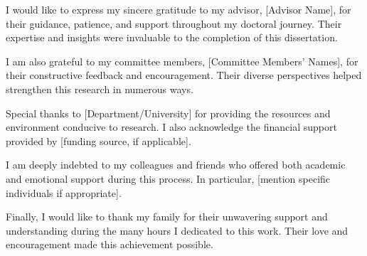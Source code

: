 I would like to express my sincere gratitude to my advisor, [Advisor Name], for their guidance, patience, and support throughout my doctoral journey. Their expertise and insights were invaluable to the completion of this dissertation.

I am also grateful to my committee members, [Committee Members' Names], for their constructive feedback and encouragement. Their diverse perspectives helped strengthen this research in numerous ways.

Special thanks to [Department/University] for providing the resources and environment conducive to research. I also acknowledge the financial support provided by [funding source, if applicable].

I am deeply indebted to my colleagues and friends who offered both academic and emotional support during this process. In particular, [mention specific individuals if appropriate].

Finally, I would like to thank my family for their unwavering support and understanding during the many hours I dedicated to this work. Their love and encouragement made this achievement possible.
